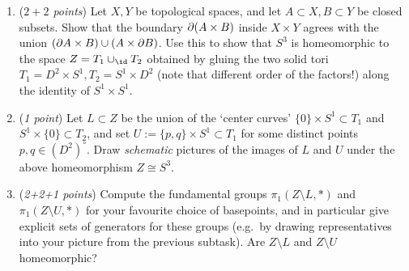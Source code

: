 \begin{sheetexercise}
\begin{enumerate}
\item (\textit{$2+2$ points}) Let $X,Y$ be topological spaces, and let $A\subset X,B\subset Y$ be closed subsets. Show that the boundary $\partial(A\times B)$ inside $X\times Y$ agrees with the union $(\partial A\times B)\cup(A\times\partial B)$. Use this to show that $S^3$ is homeomorphic to the space $Z=T_1\cup_{\id} T_2$ obtained by gluing the two solid tori $T_1=D^2\times S^1, T_2=S^1\times D^2$ (note that different order of the factors!) along the identity of $S^1\times S^1$.
\item (\textit{1 point}) Let $L\subset Z$ be the union of the `center curves' $\{0\}\times S^1\subset T_1$ and $S^1\times\{0\}\subset T_2$, and set $U\mathrel{:=}\{p,q\}\times S^1\subset T_1$ for some distinct points $p,q\in (D^2)^\circ$. Draw \emph{schematic} pictures of the images of $L$ and $U$ under the above homeomorphism $Z\cong S^3$.
\item (\textit{2+2+1 points}) Compute the fundamental groups $\pi_1(Z\setminus L,*)$ and $\pi_1(Z\setminus U,*)$ for your favourite choice of basepoints, and in particular give explicit sets of generators for these groups (e.g.~by drawing representatives into your picture from the previous subtask). Are $Z\setminus L$ and $Z\setminus U$ homeomorphic?
\end{enumerate}
\end{sheetexercise}

